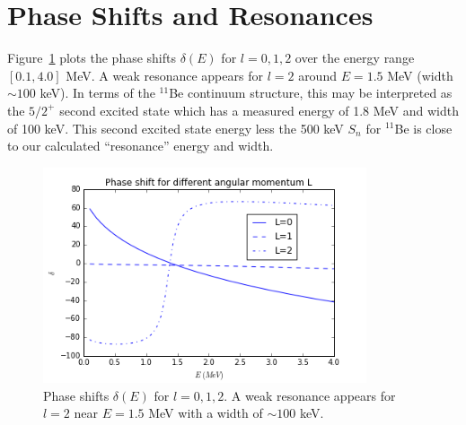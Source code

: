 \documentclass[]{scrartcl}
\begin{document}
\section*{Phase Shifts and Resonances}

Figure~\ref{fig:phase} plots the phase shifts $\delta(E)$ for $l=0,1,2$ over the energy range $[0.1,4.0]$ MeV. A weak resonance appears for $l=2$ around $E=1.5$ MeV (width $\sim 100$ keV). In terms of the $^{11}$Be continuum structure, this may be interpreted as the $5/2 ^+$ second excited state which has a measured energy of 1.8 MeV and width of 100 keV. This second excited state energy less the 500 keV $S _n $ for $^{11}$Be is close to our calculated ``resonance'' energy and width.

\begin{figure}
\centering
	\includegraphics[width=0.85\textwidth]{figures/phase.png}
	\caption{Phase shifts $\delta(E)$ for $l=0,1,2$. A weak resonance appears for $l=2$ near $E=1.5$ MeV with a width of $\sim 100$ keV.}
	\label{fig:phase}
\end{figure}




\end{document}
